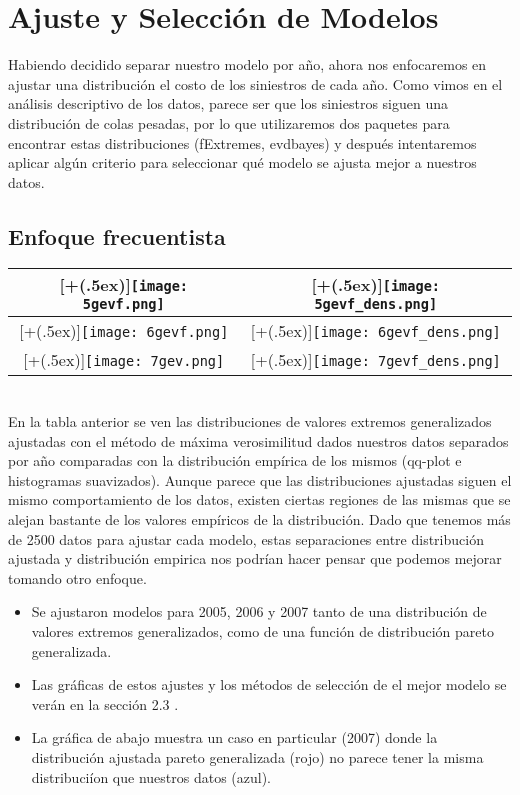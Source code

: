 \documentclass[DIV=calc, 
					paper=letter, 
					fontsize=11pt, 
					twocolumn]{scrartcl}
\newcommand*{\addheight}[2][.5ex]{%
  \raisebox{0pt}[\dimexpr\height+(#1)\relax]{#2}%
}
\begin{document}

\section{Ajuste y Selecci\'on de Modelos}
\indent Habiendo decidido separar nuestro modelo por a\~{n}o, ahora nos enfocaremos en ajustar una distribuci\'on el costo de los siniestros de cada a\~{n}o. Como vimos en el an\'alisis descriptivo de los datos, parece ser que los siniestros siguen una distribuci\'on de colas pesadas, por lo que utilizaremos dos paquetes para encontrar estas distribuciones (fExtremes, evdbayes) y despu\'es intentaremos aplicar alg\'un criterio para seleccionar qu\'e modelo se ajusta mejor a nuestros datos.\\
\subsection{Enfoque frecuentista}
\begin{tabular}{|cc|}
      \hline
      \addheight{\texttt{[image: 5gevf.png]}} &
      \addheight{\texttt{[image: 5gevf\_dens.png]}} \\
      \hline
      \addheight{\texttt{[image: 6gevf.png]}} &
       \addheight{\texttt{[image: 6gevf\_dens.png]}} \\
       \hline
      \addheight{\texttt{[image: 7gev.png]}} &
      \addheight{\texttt{[image: 7gevf\_dens.png]}} \\
      \hline
\end{tabular}\\
\noindent En la tabla anterior se ven las distribuciones de valores extremos generalizados ajustadas con el m\'etodo de m\'axima verosimilitud dados nuestros datos separados por a\~{n}o comparadas con la distribuci\'on emp\'irica de los mismos (qq-plot e histogramas suavizados). Aunque parece que las distribuciones ajustadas siguen el mismo comportamiento de los datos, existen ciertas regiones de las mismas que se alejan bastante de los valores emp\'iricos de la distribuci\'on. Dado que tenemos m\'as de 2500 datos para ajustar cada modelo, estas separaciones entre distribuci\'on ajustada y distribuci\'on empirica nos podr\'ian hacer pensar que podemos mejorar tomando otro enfoque.
\begin{itemize}
\item Se ajustaron modelos para 2005, 2006 y 2007 tanto de una distribuci\'on de valores extremos generalizados, como de una funci\'on de distribuci\'on pareto generalizada.
\item Las gr\'aficas de estos ajustes y los m\'etodos de selecci\'on de el mejor modelo se ver\'an en la secci\'on 2.3 .
\item La gr\'afica de abajo muestra un caso en particular (2007) donde la distribuci\'on ajustada pareto generalizada (rojo) no parece tener la misma distribuci\'ion que nuestros datos (azul).
\end{itemize}
\end{document}
